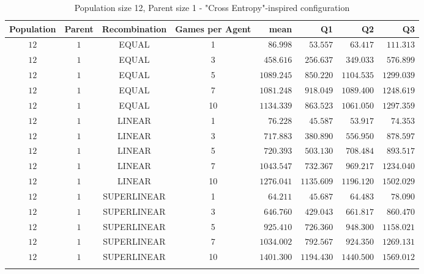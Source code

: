 \clearpage

\begin{table}[H]
\centering
\small
\begin{tabular}{c c c c r r r r}
Population & Parent & Recombination & Games per Agent & mean & Q1 & Q2 & Q3\\
\hline
$12$ & $1$ & EQUAL & 1 & $86.998$ & $53.557$ & $63.417$ & $111.313$\\
$12$ & $1$ & EQUAL & 3 & $458.616$ & $256.637$ & $349.033$ & $576.899$\\
$12$ & $1$ & EQUAL & 5 & $1089.245$ & $850.220$ & $1104.535$ & $1299.039$\\
$12$ & $1$ & EQUAL & 7 & $1081.248$ & $918.049$ & $1089.400$ & $1248.619$\\
\hdashline
$12$ & $1$ & EQUAL & 10 & $1134.339$ & $863.523$ & $1061.050$ & $1297.359$\\
\hdashline
$12$ & $1$ & LINEAR & 1 & $76.228$ & $45.587$ & $53.917$ & $74.353$\\
$12$ & $1$ & LINEAR & 3 & $717.883$ & $380.890$ & $556.950$ & $878.597$\\
$12$ & $1$ & LINEAR & 5 & $720.393$ & $503.130$ & $708.484$ & $893.517$\\
$12$ & $1$ & LINEAR & 7 & $1043.547$ & $732.367$ & $969.217$ & $1234.040$\\
\hdashline
$12$ & $1$ & LINEAR & 10 & $1276.041$ & $1135.609$ & $1196.120$ & $1502.029$\\
\hdashline
$12$ & $1$ & SUPERLINEAR & 1 & $64.211$ & $45.687$ & $64.483$ & $78.090$\\
$12$ & $1$ & SUPERLINEAR & 3 & $646.760$ & $429.043$ & $661.817$ & $860.470$\\
$12$ & $1$ & SUPERLINEAR & 5 & $925.410$ & $726.360$ & $948.300$ & $1158.021$\\
$12$ & $1$ & SUPERLINEAR & 7 & $1034.002$ & $792.567$ & $924.350$ & $1269.131$\\
\hdashline
$12$ & $1$ & SUPERLINEAR & 10 & $1401.300$ & $1194.430$ & $1440.500$ & $1569.012$\\
\hdashline
\end{tabular}
\caption{Population size 12, Parent size 1 - "Cross Entropy"-inspired configuration}
\end{table}

